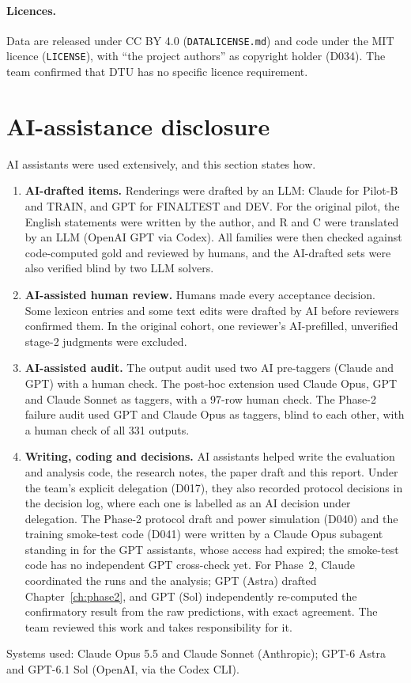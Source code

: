 \documentclass[12pt,a4paper,oneside]{report}
\renewcommand{\_}{\oldunderscore\allowbreak}
\begin{document}
\paragraph{Licences.} Data are released under CC BY 4.0 (\texttt{DATA\_LICENSE.md}) and code under the MIT licence (\texttt{LICENSE}), with ``the project authors'' as copyright holder (D034). The team confirmed that DTU has no specific licence requirement.

\section{AI-assistance disclosure}
\label{sec:aidisclosure}

AI assistants were used extensively, and this section states how.
\begin{enumerate}[nosep]
\item \textbf{AI-drafted items.} Renderings were drafted by an LLM: Claude for Pilot-B and TRAIN, and GPT for FINAL\_TEST and DEV. For the original pilot, the English statements were written by the author, and R and C were translated by an LLM (OpenAI GPT via Codex). All families were then checked against code-computed gold and reviewed by humans, and the AI-drafted sets were also verified blind by two LLM solvers.
\item \textbf{AI-assisted human review.} Humans made every acceptance decision. Some lexicon entries and some text edits were drafted by AI before reviewers confirmed them. In the original cohort, one reviewer's AI-prefilled, unverified stage-2 judgments were excluded.
\item \textbf{AI-assisted audit.} The output audit used two AI pre-taggers (Claude and GPT) with a human check. The post-hoc extension used Claude Opus, GPT and Claude Sonnet as taggers, with a 97-row human check. The Phase-2 failure audit used GPT and Claude Opus as taggers, blind to each other, with a human check of all 331 outputs.
\item \textbf{Writing, coding and decisions.} AI assistants helped write the evaluation and analysis code, the research notes, the paper draft and this report. Under the team's explicit delegation (D017), they also recorded protocol decisions in the decision log, where each one is labelled as an AI decision under delegation. The Phase-2 protocol draft and power simulation (D040) and the training smoke-test code (D041) were written by a Claude Opus subagent standing in for the GPT assistants, whose access had expired; the smoke-test code has no independent GPT cross-check yet. For Phase~2, Claude coordinated the runs and the analysis; GPT (Astra) drafted Chapter~\ref{ch:phase2}, and GPT (Sol) independently re-computed the confirmatory result from the raw predictions, with exact agreement. The team reviewed this work and takes responsibility for it.
\end{enumerate}
Systems used: Claude Opus 5.5 and Claude Sonnet (Anthropic); GPT-6 Astra and GPT-6.1 Sol (OpenAI, via the Codex CLI).
\end{document}
